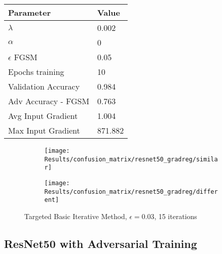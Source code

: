 \documentclass[draft,final]{vutinfth} %
\begin{document}
\begin{table}[h]
  \centering
  \begin{tabular}{ll}
    \toprule
			Parameter			& Value   \\
    \midrule
			$\lambda$								& 0.002				\\
			$\alpha$								& 0				\\
			$\epsilon$ FGSM					& 0.05		\\
			Epochs training					& 10			\\
			
			Validation Accuracy			& 0.984		\\ 
			Adv Accuracy - FGSM			& 0.763		\\
			
			Avg Input Gradient			& 1.004	\\
			Max Input Gradient			& 871.882\\
    \bottomrule
  \end{tabular}
\end{table}


\begin{figure}[h]
  \begin{subfigure}[b]{0.5\columnwidth}
		\centering
    \texttt{[image: Results/confusion\_matrix/resnet50\_gradreg/similar]}
    \label{fig:exp:cm:resnet50_gradreg:similar}
  \end{subfigure}
  \begin{subfigure}[b]{0.5\columnwidth}
		\centering
    \texttt{[image: Results/confusion\_matrix/resnet50\_gradreg/different]}
    \label{fig:exp:cm:resnet50_gradreg:different}
  \end{subfigure}
  \caption{Targeted Basic Iterative Method, $\epsilon = 0.03$, 15 iterations}
  \label{fig:exp:cm:resnet50_gradreg}
\end{figure}
\clearpage


\subsection{ResNet50 with Adversarial Training}
\end{document}
